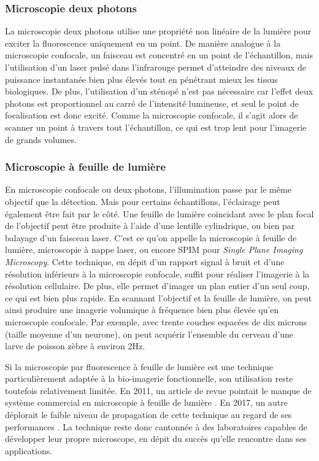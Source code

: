 \subsubsection{Microscopie deux photons}

La microscopie deux photons utilise une propriété non linéaire de la lumière pour exciter la fluorescence uniquement en un point. De manière analogue à la microscopie confocale, un faisceau est concentré en un point de l'échantillon, mais l'utilisation d'un laser pulsé dans l'infrarouge permet d'atteindre des niveaux de puissance instantanée bien plus élevés tout en pénétrant mieux les tissus biologiques. De plus, l'utilisation d'un sténopé n'est pas nécessaire car l'effet deux photons est proportionnel au carré de l'intensité lumineuse, et seul le point de focalisation est donc excité. Comme la microscopie confocale, il s'agit alors de scanner un point à travers tout l'échantillon, ce qui est trop lent pour l'imagerie de grands volumes.  

\subsubsection{Microscopie à feuille de lumière}

En microscopie confocale ou deux photons, l'illumination passe par le même objectif que la détection. Mais pour certains échantillons, l'éclairage peut également être fait par le côté. Une feuille de lumière coïncidant avec le plan focal de l'objectif peut être produite à l'aide d'une lentille cylindrique, ou bien par balayage d'un faisceau laser. C'est ce qu'on appelle la microscopie à feuille de lumière, microscopie à nappe laser, ou encore SPIM pour \emph{Single Plane Imaging Microscopy}. Cette technique, en dépit d'un rapport signal à bruit et d'une résolution inférieurs à la microscopie confocale, suffit pour réaliser l'imagerie à la résolution cellulaire. De plus, elle permet d'imager un plan entier d'un seul coup, ce qui est bien plus rapide. En scannant l'objectif et la feuille de lumière, on peut ainsi produire une imagerie volumique à fréquence bien plus élevée qu'en microscopie confocale. Par exemple, avec trente couches espacées de dix microns (taille moyenne d'un neurone), on peut acquérir l'ensemble du cerveau d'une larve de poisson zèbre à environ 2Hz.

Si la microscopie par fluorescence à feuille de lumière est une technique particulièrement adaptée à la bio-imagerie fonctionnelle, son utilisation reste toutefois relativement limitée. En 2011, un article de revue pointait le manque de système commercial en microscopie à feuille de lumière \cite{santi_light_2011}. En 2017, un autre déplorait le faible niveau de propagation de cette technique au regard de ses performances \cite{power_guide_2017}. La technique reste donc cantonnée à des laboratoires capables de développer leur propre microscope, en dépit du succès qu'elle rencontre dans ses applications.



